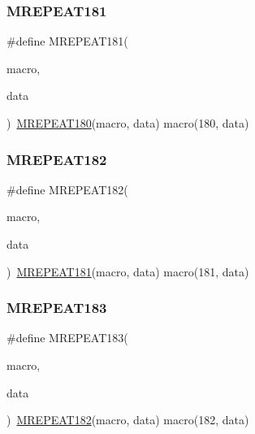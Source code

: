\mbox{\label{group__group__sam0__utils__mrepeat_ga2596ba634c8c3cc9001bdb16a5228933}} 
\subsubsection{\texorpdfstring{MREPEAT181}{MREPEAT181}}
{\footnotesize\ttfamily \#define M\+R\+E\+P\+E\+A\+T181(\begin{DoxyParamCaption}\item[{}]{macro,  }\item[{}]{data }\end{DoxyParamCaption})~\mbox{\hyperlink{group__group__sam0__utils__mrepeat_ga131a0e131d380f253f0748364eb9cc3f}{M\+R\+E\+P\+E\+A\+T180}}(macro, data)   macro(180, data)}

\mbox{\label{group__group__sam0__utils__mrepeat_ga958c679aab7f419465b7d099d790a944}} 
\subsubsection{\texorpdfstring{MREPEAT182}{MREPEAT182}}
{\footnotesize\ttfamily \#define M\+R\+E\+P\+E\+A\+T182(\begin{DoxyParamCaption}\item[{}]{macro,  }\item[{}]{data }\end{DoxyParamCaption})~\mbox{\hyperlink{group__group__sam0__utils__mrepeat_ga2596ba634c8c3cc9001bdb16a5228933}{M\+R\+E\+P\+E\+A\+T181}}(macro, data)   macro(181, data)}

\mbox{\label{group__group__sam0__utils__mrepeat_ga413ea4db626945b91fb34b078615b02c}} 
\subsubsection{\texorpdfstring{MREPEAT183}{MREPEAT183}}
{\footnotesize\ttfamily \#define M\+R\+E\+P\+E\+A\+T183(\begin{DoxyParamCaption}\item[{}]{macro,  }\item[{}]{data }\end{DoxyParamCaption})~\mbox{\hyperlink{group__group__sam0__utils__mrepeat_ga958c679aab7f419465b7d099d790a944}{M\+R\+E\+P\+E\+A\+T182}}(macro, data)   macro(182, data)}

